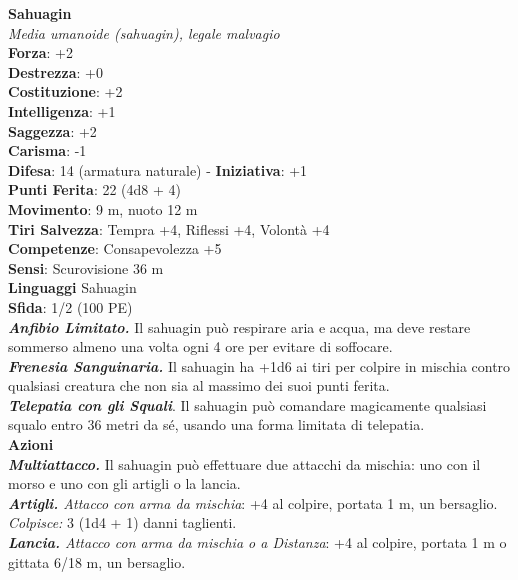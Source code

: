 \begin{multicols}{2}
\medskip\textbf{Sahuagin}\\
\emph{Media umanoide (sahuagin), legale malvagio}\\
\textbf{Forza}: +2\\
\textbf{Destrezza}: +0\\
\textbf{Costituzione}: +2\\
\textbf{Intelligenza}: +1\\
\textbf{Saggezza}: +2\\
\textbf{Carisma}: -1\\
\textbf{Difesa}: 14 (armatura naturale) - \textbf{Iniziativa}: +1\\
\textbf{Punti Ferita}: 22 (4d8 + 4)\\
\textbf{Movimento}: 9 m, nuoto 12 m\\
\textbf{Tiri Salvezza}: Tempra +4, Riflessi +4, Volontà +4\\
\textbf{Competenze}: Consapevolezza +5\\
\textbf{Sensi}: Scurovisione 36 m\\
\textbf{Linguaggi} Sahuagin\\
\textbf{Sfida}: 1/2 (100 PE)\smallskip\\
\emph{\textbf{Anfibio Limitato.}} Il sahuagin può respirare aria e acqua, ma deve restare sommerso almeno una volta ogni 4 ore per evitare di soffocare.\\

\emph{\textbf{Frenesia Sanguinaria.}} Il sahuagin ha +1d6 ai tiri per colpire in mischia contro qualsiasi creatura che non sia al massimo dei suoi punti ferita.\\

\emph{\textbf{Telepatia con gli Squali}}. Il sahuagin può comandare magicamente qualsiasi squalo entro 36 metri da sé, usando una forma limitata di telepatia.\\

\smallskip\textbf{Azioni}\\

\emph{\textbf{Multiattacco.}} Il sahuagin può effettuare due attacchi da mischia: uno con il morso e uno con gli artigli o la lancia.\\
\emph{\textbf{Artigli.} Attacco con arma da mischia}: +4 al colpire, portata 1 m, un bersaglio.\\
\emph{Colpisce:} 3 (1d4 + 1) danni taglienti.\\
\emph{\textbf{Lancia.} Attacco con arma da mischia o a Distanza}: +4 al colpire, portata 1 m o gittata 6/18 m, un bersaglio.\\


\end{multicols}
